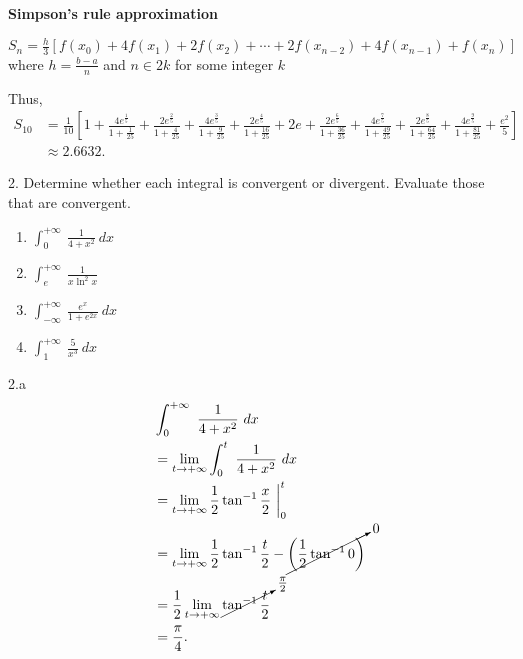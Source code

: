 \documentclass{report}
\begin{document}
    \bigbreak \noindent 
    \textbf{Simpson's rule approximation}
    \bigbreak \noindent 
    \begin{remark}
        $S_{n} = \frac{h}{3}\left[f(x_{0}) + 4f(x_{1}) + 2f(x_{2}) + \cdots + 2f(x_{n-2}) + 4f(x_{n-1}) + f(x_{n})\right] $ where $h = \frac{b-a}{n}$ and $n \in 2k$ for some integer $k $
    \end{remark}
    \bigbreak \noindent 
    Thus,
    \begin{align*}
        S_{10} &= \frac{1}{10}\left[1 + \frac{4e^{\frac{1}{5}}}{1+\frac{1}{25}} + \frac{2e^{\frac{2}{5}}}{1+\frac{4}{25}} + \frac{4e^{\frac{3}{5}}}{1+\frac{9}{25}} + \frac{2e^{\frac{4}{5}}}{1+\frac{16}{25}} + 2e+ \frac{2e^{\frac{6}{5}}}{1+\frac{36}{25}} + \frac{4e^{\frac{7}{5}}}{1+\frac{49}{25}} + \frac{2e^{\frac{8}{5}}}{1+\frac{64}{25}} + \frac{4e^{\frac{9}{5}}}{1+\frac{81}{25}} + \frac{e^{2}}{5}\right] \\
               &\approx 2.6632
    .\end{align*}

    \pagebreak \bigbreak \noindent 
    \begin{mdframed}
        2. Determine whether each integral is convergent or divergent. Evaluate those that are convergent.
        \begin{enumerate}[label=(\alph*)]
            \item $\int_{0}^{+\infty}\ \frac{1}{4+x^{2}}\ dx $  
            \item $\int_{e}^{+\infty}\ \frac{1}{x\ln^{2}{x}}$
            \item $\int_{-\infty}^{+\infty}\ \frac{e^{x}}{1+e^{2x}}\ dx $
            \item $\int_{1}^{+\infty}\ \frac{5}{x^{3}}\ dx $
        \end{enumerate}
    \end{mdframed}

    \bigbreak \noindent 
    2.a
    \begin{align*}
        &\int_{0}^{+\infty}\ \frac{1}{4+x^{2}}\ dx \\
        &=\lim\limits_{t \to +\infty}{\int_{0}^{t}\ \frac{1}{4+x^{2}}\ dx} \\
        &= \lim\limits_{t \to +\infty}{\frac{1}{2}\tan^{-1}{\frac{x}{2}}}\ \bigg|_0^{t} \\
        &= \lim\limits_{t \to +\infty}{\frac{1}{2}\tan^{-1}{\frac{t}{2}}} - \cancelto{0}{\left(\frac{1}{2}\tan^{-1}{0}\right)} \\
        &=\frac{1}{2}\lim\limits_{t \to +\infty}{\cancelto{\frac{\pi}{2}}{\tan^{-1}{\frac{t}{2}}}} \\
        &=\frac{\pi}{4}
    .\end{align*}
\end{document}
